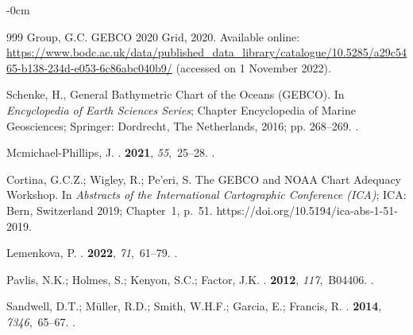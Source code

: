 \documentclass[sustainability,article,accept,pdftex,moreauthors]{Definitions/mdpi}
\begin{document}
\begin{adjustwidth}{-\extralength}{0cm}
\begin{thebibliography}{999}
Group, G.C.
\newblock GEBCO 2020 Grid, 2020.
\newblock  Available online: %
 \url{https://www.bodc.ac.uk/data/published_data_library/catalogue/10.5285/a29c5465-b138-234d-e053-6c86abc040b9/} (accessed on 1 November 2022). %


Schenke, H., {General Bathymetric Chart of the Oceans (GEBCO)}.
\newblock In {\em {Encyclopedia of Earth Sciences Series}}; Chapter Encyclopedia of Marine Geosciences; Springer:
  Dordrecht, The Netherlands,  2016; 
  pp. 268--269.
.

Mcmichael-Phillips, J.
.
 {\bf 2021}, {\em 55},~25--28.
.

Cortina, G.C.Z.; Wigley, R.; {Pe'eri}, S. {The GEBCO and NOAA Chart Adequacy
  Workshop}.
\newblock In {\em {Abstracts of the International Cartographic Conference
  (ICA)}}; ICA: Bern, Switzerland %
  2019; Chapter~1, p.~51.
\newblock https://doi.org/10.5194/ica-abs-1-51-2019.

Lemenkova, P.
.
 {\bf 2022}, {\em
  71},~61--79.
.

Pavlis, N.K.; Holmes, S.; Kenyon, S.C.; Factor, J.K.
.
 {\bf 2012}, {\em 117},~B04406.
.

Sandwell, D.T.; Müller, R.D.; Smith, W.H.F.; Garcia, E.; Francis, R.
.
 {\bf 2014}, {\em 7346},~65--67.
.


\end{thebibliography}
\end{adjustwidth}
\end{document}
